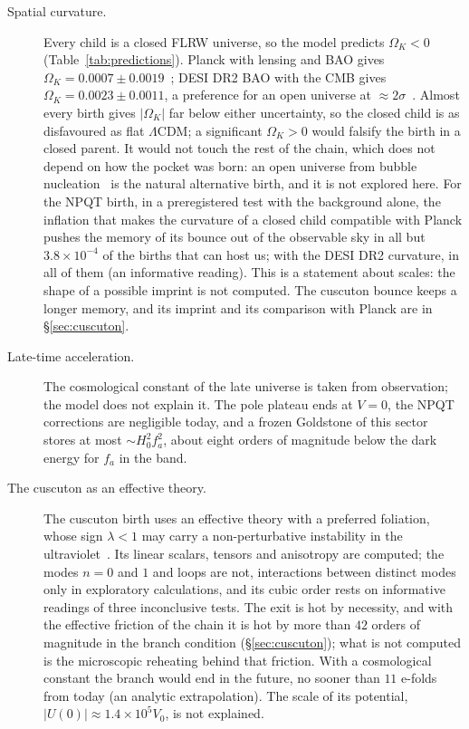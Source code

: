 \documentclass[11pt,a4paper]{article}
\begin{document}
\begin{description}
\item[Spatial curvature.] Every child is a closed FLRW universe, so the model predicts $\Omega_K<0$ (Table~\ref{tab:predictions}). Planck with lensing and BAO gives $\Omega_K=0.0007\pm0.0019$~\cite{Planck2018X}; DESI DR2 BAO with the CMB gives $\Omega_K=0.0023\pm0.0011$, a preference for an open universe at $\approx2\sigma$~\cite{DESI2025DR2,ChenZaldarriaga2025}. Almost every birth gives $|\Omega_K|$ far below either uncertainty, so the closed child is as disfavoured as flat $\Lambda$CDM; a significant $\Omega_K>0$ would falsify the birth in a closed parent. It would not touch the rest of the chain, which does not depend on how the pocket was born: an open universe from bubble nucleation~\cite{ColemanDeLuccia1980,BucherGoldhaberTurok1995} is the natural alternative birth, and it is not explored here. For the NPQT birth, in a preregistered test with the background alone, the inflation that makes the curvature of a closed child compatible with Planck pushes the memory of its bounce out of the observable sky in all but $3.8\times10^{-4}$ of the births that can host us; with the DESI DR2 curvature, in all of them (an informative reading). This is a statement about scales: the shape of a possible imprint is not computed. The cuscuton bounce keeps a longer memory, and its imprint and its comparison with Planck are in \S\ref{sec:cuscuton}.
\item[Late-time acceleration.] The cosmological constant of the late universe is taken from observation; the model does not explain it. The pole plateau ends at $V=0$, the NPQT corrections are negligible today, and a frozen Goldstone of this sector stores at most $\sim H_0^2f_a^2$, about eight orders of magnitude below the dark energy for $f_a$ in the band.
\item[The cuscuton as an effective theory.] The cuscuton birth uses an effective theory with a preferred foliation, whose sign $\lambda<1$ may carry a non-perturbative instability in the ultraviolet~\cite{Afshordi2009}. Its linear scalars, tensors and anisotropy are computed; the modes $n=0$ and $1$ and loops are not, interactions between distinct modes only in exploratory calculations, and its cubic order rests on informative readings of three inconclusive tests. The exit is hot by necessity, and with the effective friction of the chain it is hot by more than $42$ orders of magnitude in the branch condition (\S\ref{sec:cuscuton}); what is not computed is the microscopic reheating behind that friction. With a cosmological constant the branch would end in the future, no sooner than $11$ e-folds from today (an analytic extrapolation). The scale of its potential, $|U(0)|\approx1.4\times10^{5}V_0$, is not explained.

\end{description}
\end{document}
